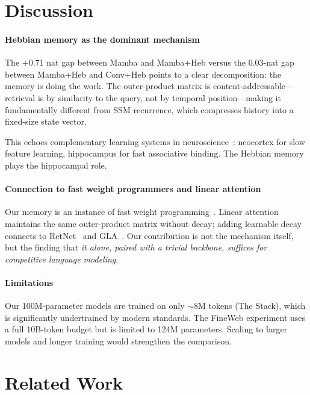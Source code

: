 \documentclass{article}
\begin{document}
\section{Discussion}

\paragraph{Hebbian memory as the dominant mechanism}
The $+$0.71 nat gap between Mamba and Mamba+Heb versus the 0.03-nat gap between Mamba+Heb and Conv+Heb points to a clear decomposition: the memory is doing the work. The outer-product matrix is content-addressable---retrieval is by similarity to the query, not by temporal position---making it fundamentally different from SSM recurrence, which compresses history into a fixed-size state vector.

This echoes complementary learning systems in neuroscience~\citep{mcclelland1995complementary}: neocortex for slow feature learning, hippocampus for fast associative binding. The Hebbian memory plays the hippocampal role.

\paragraph{Connection to fast weight programmers and linear attention}
Our memory is an instance of fast weight programming~\citep{schmidhuber1992learning,ba2016using,schlag2021linear}. Linear attention~\citep{katharopoulos2020transformers} maintains the same outer-product matrix without decay; adding learnable decay connects to RetNet~\citep{sun2023retentive} and GLA~\citep{yang2024gated}. Our contribution is not the mechanism itself, but the finding that \emph{it alone, paired with a trivial backbone, suffices for competitive language modeling}.

\paragraph{Limitations}
Our 100M-parameter models are trained on only $\sim$8M tokens (The Stack), which is significantly undertrained by modern standards. The FineWeb experiment uses a full 10B-token budget but is limited to 124M parameters. Scaling to larger models and longer training would strengthen the comparison.

\section{Related Work}
\end{document}
